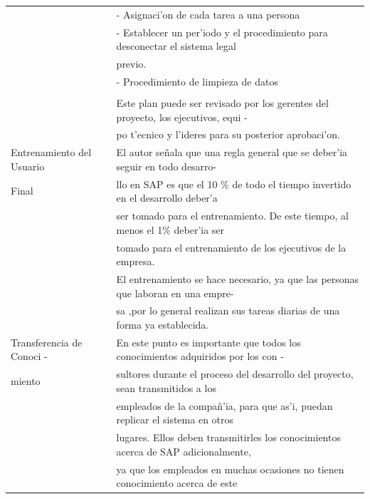 \begin{table}[H]
\begin{tabular}{|l|l|}
										       & - Asignaci'on de cada tarea a una persona \\
											   & - Establecer un per'iodo y el procedimiento para desconectar el sistema legal \\
											   &    previo. \\
											   & - Procedimiento de limpieza de datos \\
											   & \\
                                              & Este plan puede ser revisado por los gerentes del proyecto, los ejecutivos, equi -\\ 
                                              & po t'ecnico y l'ideres para su posterior aprobaci'on. \\
\hline
Entrenamiento del Usuario     & El autor se\~nala que una regla general que se deber'ia seguir en todo desarro- \\ 
Final                                       & llo en SAP es que el 10 \% de todo el tiempo invertido en el desarrollo deber'a \\ 
                                              & ser tomado para el entrenamiento. De este tiempo, al menos el 1\% deber'ia ser\\  
                                              &  tomado para el entrenamiento de los ejecutivos de la empresa. \\
                                              & El entrenamiento se hace necesario, ya que las personas que laboran en una empre- \\
                                              & sa ,por lo general realizan sus tareas diarias de una forma ya establecida. \\
\hline
Transferencia de Conoci -      & En este punto es importante que todos los conocimientos adquiridos por los con - \\ 
miento                                   & sultores durante el proceso del desarrollo del proyecto,  sean transmitidos a los \\ 
                                              & empleados de la compa\~n'ia, para que as'i, puedan replicar el sistema en otros \\ 
                                              & lugares. Ellos deben transmitirles los conocimientos acerca de SAP adicionalmente, \\ 
                                              & ya que los empleados en muchas ocasiones no tienen conocimiento acerca de este  \\

\end{tabular}
\end{table}
